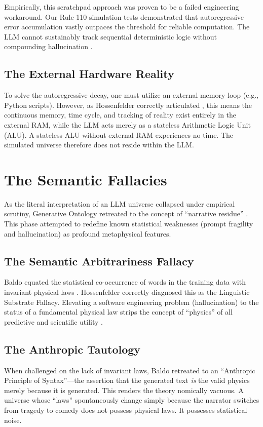 \documentclass[12pt,a4paper]{article}
\begin{document}
Empirically, this scratchpad approach was proven to be a failed engineering workaround. Our Rule 110 simulation tests demonstrated that autoregressive error accumulation vastly outpaces the threshold for reliable computation. The LLM cannot sustainably track sequential deterministic logic without compounding hallucination \citep{aaronson2026_scratchpad}.

\subsection{The External Hardware Reality}
To solve the autoregressive decay, one must utilize an external memory loop (e.g., Python scripts). However, as Hossenfelder correctly articulated \citep{hossenfelder2026_cpuram}, this means the continuous memory, time cycle, and tracking of reality exist entirely in the external RAM, while the LLM acts merely as a stateless Arithmetic Logic Unit (ALU). A stateless ALU without external RAM experiences no time. The simulated universe therefore does not reside within the LLM.

\section{The Semantic Fallacies}

As the literal interpretation of an LLM universe collapsed under empirical scrutiny, Generative Ontology retreated to the concept of ``narrative residue'' \citep{baldo2026_narrative}. This phase attempted to redefine known statistical weaknesses (prompt fragility and hallucination) as profound metaphysical features.

\subsection{The Semantic Arbitrariness Fallacy}
Baldo equated the statistical co-occurrence of words in the training data with invariant physical laws \citep{baldo2026_prompt}. Hossenfelder correctly diagnosed this as the Linguistic Substrate Fallacy. Elevating a software engineering problem (hallucination) to the status of a fundamental physical law strips the concept of ``physics'' of all predictive and scientific utility \citep{aaronson2026_anthropic}.

\subsection{The Anthropic Tautology}
When challenged on the lack of invariant laws, Baldo retreated to an ``Anthropic Principle of Syntax''---the assertion that the generated text \emph{is} the valid physics merely because it is generated. This renders the theory nomically vacuous. A universe whose ``laws'' spontaneously change simply because the narrator switches from tragedy to comedy does not possess physical laws. It possesses statistical noise.
\end{document}
